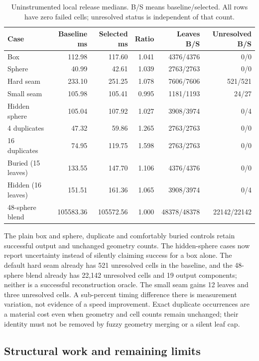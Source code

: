 \documentclass[11pt]{article}
\begin{document}
\begin{table}[htbp]
\centering\footnotesize
\begin{tabular}{@{}lrrrrr@{}}
\toprule
Case & Baseline ms & Selected ms & Ratio & Leaves B/S & Unresolved B/S \\
\midrule
Box & 112.98 & 117.60 & 1.041 & 4376/4376 & 0/0 \\
Sphere & 40.99 & 42.61 & 1.039 & 2763/2763 & 0/0 \\
Hard seam & 233.10 & 251.25 & 1.078 & 7606/7606 & 521/521 \\
Small seam & 105.98 & 105.41 & 0.995 & 1181/1193 & 24/27 \\
Hidden sphere & 105.04 & 107.92 & 1.027 & 3908/3974 & 0/4 \\
4 duplicates & 47.32 & 59.86 & 1.265 & 2763/2763 & 0/0 \\
16 duplicates & 74.95 & 119.75 & 1.598 & 2763/2763 & 0/0 \\
Buried (15 leaves) & 133.55 & 147.70 & 1.106 & 4376/4376 & 0/0 \\
Hidden (16 leaves) & 151.51 & 161.36 & 1.065 & 3908/3974 & 0/4 \\
48-sphere blend & 105583.36 & 105572.56 & 1.000 & 48378/48378 & 22142/22142 \\
\bottomrule
\end{tabular}
\caption{Uninstrumented local release medians. B/S means baseline/selected. All rows have zero failed cells; unresolved status is independent of that count.}
\label{tab:discovery-cost}
\end{table}

The plain box and sphere, duplicate and comfortably buried controls retain
successful output and unchanged geometry counts. The hidden-sphere cases now
report uncertainty instead of silently claiming success for a box alone.
The default hard seam already has 521 unresolved cells in the baseline, and
the 48-sphere blend already has 22,142 unresolved cells and 19 output
components; neither is a successful reconstruction oracle. The small seam
gains 12 leaves and three unresolved cells. A sub-percent timing difference
there is measurement variation, not evidence of a speed improvement.
Exact duplicate occurrences are a material cost even when geometry and cell
counts remain unchanged; their identity must not be removed by fuzzy geometry
merging or a silent leaf cap.

\subsection{Structural work and remaining limits}
\end{document}
